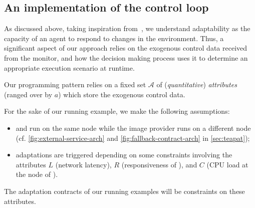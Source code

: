 \subsection{An implementation of the control loop}\label{sec:control-loop}
%
As discussed above, taking inspiration from~\cite{bcglv12}, we
understand adaptability as the capacity of an agent to respond to
changes in the environment.
%
Thus, a significant aspect of our approach relies on the exogenous
control data received from the monitor, and how the decision making
process uses it to determine an appropriate execution scenario at
runtime.

Our programming pattern relies on a fixed set $\mathcal{A}$ of
(\emph{quantitative}) \emph{attributes} (ranged over by $a$) which
store the exogenous control data.

\begin{example}\label{exe:attributes}
  For the sake of our running example, we make the following assumptions:
  \begin{itemize}
  \item {} and  run on the same node while the image
	 provider  runs on a different node (cf.
	 \cref{fig:external-service-arch} and \cref{fig:fallback-contract-arch} in \cref{sec:teapat});
  \item adaptations are triggered depending on some constraints
	 involving the attributes $L$ (network latency), $R$
	 (responsiveness of ), and $C$ (CPU load at the node of ).
  \end{itemize}
  The adaptation contracts of our running examples will be constraints
  on these attributes.
  \finex
\end{example}

